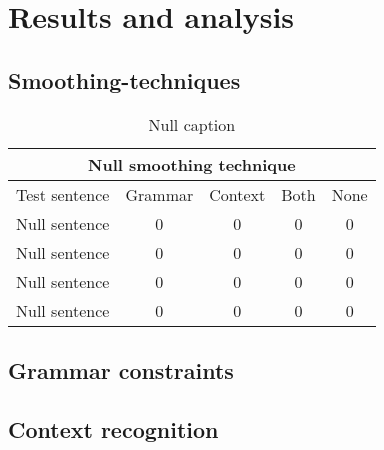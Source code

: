 \section{Results and analysis}
\lipsum[2-3]
\subsection{Smoothing-techniques}
\lipsum[1]
\vspace{1em}
\begin{table}[ht]

\centering
{\footnotesize
\begin{tabular}{ |p{}|c|c|c|c| }
	\hline
	\multicolumn{5}{|c|}{Null smoothing technique} \\
	\hline
	\multicolumn{1}{|c|}{Test sentence} & Grammar & Context & Both & None \\
	\hline
	Null sentence & 0 & 0 & 0 & 0 \\
	\hline
	Null sentence & 0 & 0 & 0 & 0 \\
	\hline
	Null sentence & 0 & 0 & 0 & 0 \\
	\hline
	Null sentence & 0 & 0 & 0 & 0 \\
	\hline
\end{tabular}
}
\caption{Null caption}
\end{table}
\vspace{1em}
\lipsum[1]
\subsection{Grammar constraints}
\lipsum[2-3]
\subsection{Context recognition}
\lipsum[2-3]